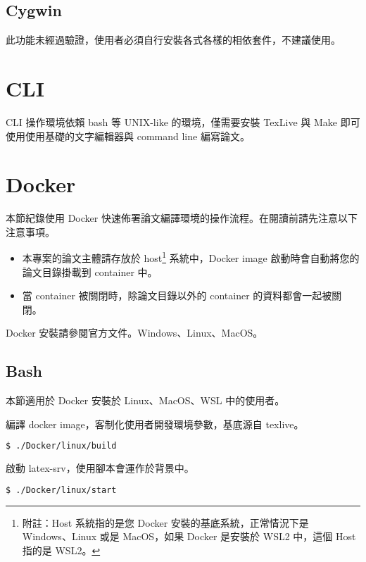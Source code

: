 \subsection{Cygwin}

此功能未經過驗證，使用者必須自行安裝各式各樣的相依套件，不建議使用。

\section{CLI}

CLI 操作環境依賴 bash 等 UNIX-like 的環境，僅需要安裝 TexLive 與 Make 即可使用使用基礎的文字編輯器與 command line 編寫論文。

\section{Docker}

本節紀錄使用 Docker 快速佈署論文編譯環境的操作流程。在閱讀前請先注意以下注意事項。

\begin{itemize}
        \item 本專案的論文主體請存放於 host\footnote{附註：Host 系統指的是您 Docker 安裝的基底系統，正常情況下是 Windows、Linux 或是 MacOS，如果 Docker 是安裝於 WSL2 中，這個 Host 指的是 WSL2。} 系統中，Docker image 啟動時會自動將您的論文目錄掛載到 container 中。
        \item 當 container 被關閉時，除論文目錄以外的 container 的資料都會一起被關閉。
\end{itemize}

Docker 安裝請參閱官方文件。Windows\cite{win_docker}、Linux\cite{linux_docker}、MacOS\cite{mac_docker}。

\subsection{Bash}

本節適用於 Docker 安裝於 Linux、MacOS、WSL 中的使用者。

編譯 docker image，客制化使用者開發環境參數，基底源自 texlive\cite{docker_texlive}。
\begin{lstlisting}[language=bash]
        $ ./Docker/linux/build
\end{lstlisting}

啟動 latex-srv，使用腳本會運作於背景中。
\begin{lstlisting}[language=bash]
        $ ./Docker/linux/start
\end{lstlisting}

